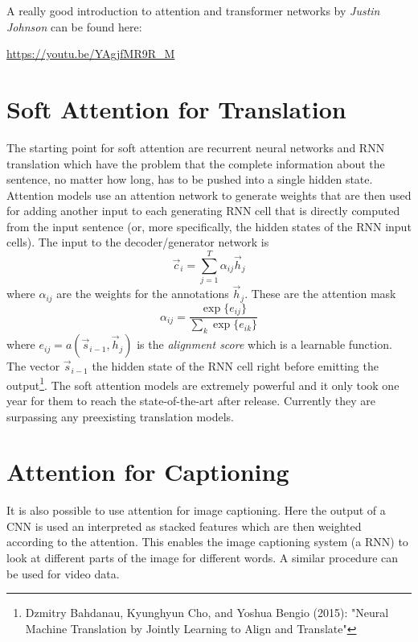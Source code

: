 	A really good introduction to attention and transformer networks by \emph{Justin Johnson} can be found here:
	\begin{center}
		\url{https://youtu.be/YAgjfMR9R_M}
	\end{center}

	\section{Soft Attention for Translation}
		The starting point for soft attention are recurrent neural networks and RNN translation which have the problem that the complete information about the sentence, no matter how long, has to be pushed into a single hidden state. Attention models use an attention network to generate weights that are then used for adding another input to each generating RNN cell that is directly computed from the input sentence (or, more specifically, the hidden states of the RNN input cells). The input to the decoder/generator network is
		\begin{equation}
			\vec{c}_i = \sum_{j = 1}^{T} \alpha_{ij} \vec{h}_j
		\end{equation}
		where \(\alpha_{ij}\) are the weights for the annotations \(\vec{h}_j\). These are the attention mask
		\begin{equation}
			\alpha_{ij} = \frac{\exp\{ e_{ij} \}}{\sum_k \exp\{ e_{ik} \}}
		\end{equation}
		where \( e_{ij} = a(\vec{s}_{i - 1}, \vec{h}_j) \) is the \emph{alignment score} which is a learnable function. The vector \(\vec{s}_{i - 1}\) the hidden state of the RNN cell right before emitting the output\footnote{Dzmitry Bahdanau, Kyunghyun Cho, and Yoshua Bengio (2015): "Neural Machine Translation by Jointly Learning to Align and Translate"}. The soft attention models are extremely powerful and it only took one year for them to reach the state-of-the-art after release. Currently they are surpassing any preexisting translation models.


	\section{Attention for Captioning}
		It is also possible to use attention for image captioning. Here the output of a CNN is used an interpreted as stacked features which are then weighted according to the attention. This enables the image captioning system (a RNN) to look at different parts of the image for different words. A similar procedure can be used for video data.

